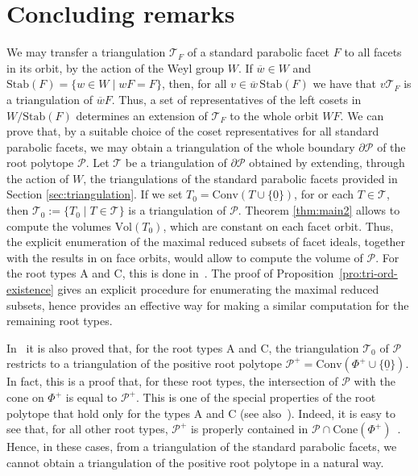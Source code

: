 \documentclass[ALCO,published]{cedram}
\newcommand\pol{\mathcal P}
\theoremstyle{plain}
\newcommand\ov{\overline}
\newcommand\mc{\mathcal}
\newcommand\nullvec{\underline 0}
\newcommand\pol{\mathcal P}
\newcommand\conv{\mathrm{Conv}}
\newcommand\cone{\mathrm{Cone}}
\begin{document}
\section{Concluding remarks}\label{sec:concl}

We may transfer a triangulation $\mc T_F$ of a standard parabolic facet $F$ to all facets in its orbit, by the action of the Weyl group $W$. 
If $\ov w\in W$ and $\textrm{Stab}(F)=\{w\in W\mid wF=F\}$, then, for all $v \in \ov w\,\textrm{Stab}(F)$ we have that $v\mc T_F$ is a triangulation of $\ov wF$. 
Thus, a set of representatives of the left cosets in $W/\textrm{Stab}(F)$ determines an extension of $\mc T_F$ to the whole orbit $WF$.
We can prove that, by a suitable choice of the coset representatives for all standard parabolic facets, we may obtain a triangulation of the whole boundary $\partial\pol$ of the root polytope $\mc P$.
Let  $\mc T$ be a triangulation of $\partial \pol$ obtained by extending,  through the action of $W$,  the triangulations of the standard parabolic facets provided in Section \ref{sec:triangulation}.
If we set  $T_0=\conv(T\cup \{\nullvec\})$, for or each $T\in  \mc T$, then $\mc T_0:=\{T_0\mid T\in \mc T\}$ is a triangulation of $\pol$. 
Theorem \ref{thm:main2} allows to compute the volumes $\textrm{Vol}(T_0)$, which are constant on each facet orbit.  
Thus,  the explicit enumeration of the maximal reduced subsets of  facet ideals, together with the results in \cite{CM1} on face orbits, would allow to compute the volume of $\pol$.
For the root types $\mathrm A$ and $\mathrm C$, this is done in~\cite{CM2}. 
The proof of Proposition~\ref{pro:tri-ord-existence} gives an explicit procedure for enumerating the maximal reduced subsets, hence provides an effective way for making a similar computation for the remaining root types.

\par
In~\cite{CM2} it is also proved that, for the root types $\mathrm A$ and $\mathrm C$, the triangulation $\mc T_0$ of $\pol$ restricts to a triangulation of the positive root polytope $\pol^+=\conv(\Phi^+\cup \{\nullvec\})$. 
In fact, this is a proof that, for these root types, the intersection of $\pol$ with the cone on $\Phi^+$ is equal to $\pol^+$.
This is one of the special properties of the root polytope that hold only for the  types $\mathrm A$ and $\mathrm C$ (see also~\cite{CM3}).
Indeed, it is easy to see that, for all other root types, $\pol^+$ is properly contained  in $\pol\cap \cone(\Phi^+)$~\cite{Ch}.
Hence, in these cases, from a triangulation of the standard parabolic facets, we cannot obtain a triangulation of the positive root polytope in a natural way. 
%


\end{document}
